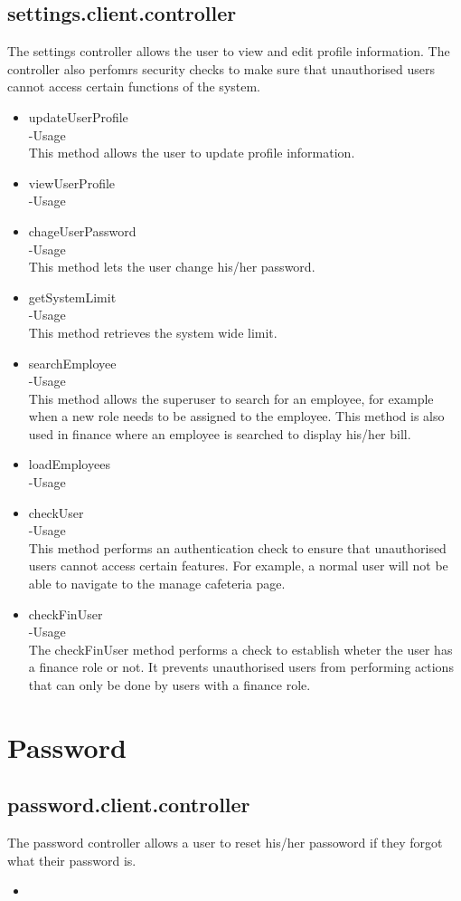 \documentclass[a4paper,12pt]{article}
\begin{document}
 \subsection{settings.client.controller}
 The settings controller allows the user to view and edit profile information. The controller also perfomrs security checks to make sure that unauthorised users cannot access certain functions of the system. 
 \begin{itemize}
 \item updateUserProfile\\
 -Usage\\
 This method allows the user to update profile information.
\item viewUserProfile\\
-Usage\\

\item chageUserPassword\\
-Usage\\
This method lets the user change his/her password.

\item getSystemLimit\\
-Usage\\
This method retrieves the system wide limit.

\item searchEmployee\\
-Usage\\
This method allows the superuser to search for an employee, for example when a new role needs to be assigned to the employee.
This method is also used in finance where an employee is searched to display his/her bill.

\item loadEmployees\\
-Usage\\

\item checkUser\\
-Usage\\
This method performs an authentication check to ensure that unauthorised users cannot access certain features. For example, a normal user will not be able to navigate to the manage cafeteria page.

\item checkFinUser\\
-Usage\\
The checkFinUser method performs a check to establish wheter the user has a finance role or not. It prevents unauthorised users from performing actions that can only be done by users with a finance role.
 \end{itemize}
 \section{Password}
 \subsection{password.client.controller}
 The password controller allows a user to reset his/her passoword if they forgot what their password is. 
 \begin{itemize}
 \item 
 \end{itemize}
 
\end{document}
